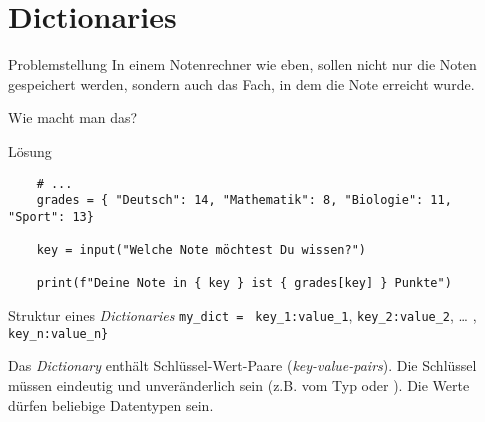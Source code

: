 \section{Dictionaries}

\begin{frame}
\begin{block}{Problemstellung}
\vspace{2pt}
In einem Notenrechner wie eben, sollen nicht nur die Noten gespeichert werden, sondern auch das Fach, in dem die Note erreicht wurde. 

\vspace{8pt}

Wie macht man das? 
\end{block}
\end{frame}

\begin{fragile}{}
\begin{block}{Lösung}
	\begin{verbatim}
	# ...
	grades = { "Deutsch": 14, "Mathematik": 8, "Biologie": 11, "Sport": 13}
	
	key = input("Welche Note möchtest Du wissen?")
	
	print(f"Deine Note in { key } ist { grades[key] } Punkte")
	\end{verbatim}
\end{block}
\end{fragile}

\begin{fragile}
	
	\begin{block}{Struktur eines \emph{Dictionaries}}
		\vspace{2pt}
		\large
		\texttt{my\_dict = }\pause {\Large\texttt{\{}}\pause 
		\texttt{key\_1}\pause\texttt{:}\pause\texttt{value\_1}\pause,
		\pause 
		\texttt{key\_2:value\_2}, \pause 
		\dots   
		, \texttt{key\_n:value\_n}\pause \Large{\texttt{\}}}
	\end{block}
	\pause 
	
	Das \emph{Dictionary}  enthält Schlüssel-Wert-Paare (\emph{key-value-pairs}). Die Schlüssel müssen eindeutig und unveränderlich sein (z.B. vom Typ  oder ). Die Werte dürfen beliebige Datentypen sein. 
	
\end{fragile}

